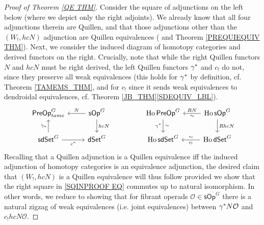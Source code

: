 \documentclass[a4paper,10pt
,draft
]{article}%
\numberwithin{equation}{section}
\numberwithin{figure}{section}
\theoremstyle{definition} %
\DeclareMathOperator{\Ho}{Ho}
\renewcommand{\O}{\ensuremath{\mathcal O}}
\newcommand{\1}{\ensuremath{\mathbbm 1}}%
\begin{document}
\begin{proof}[Proof of Theorem \ref{QE THM}]
Consider the square of adjunctions on the left below 
(where we depict only the right adjoints).
We already know that all four adjunctions therein are Quillen,
and that those adjunctions other than the
$(W_!,hcN)$
adjunction are Quillen equivalences
(\cite[Thms. 4.30 and 4.41]{BP_edss} and Theorem \ref{PREQUIEQUIV THM}).
Next, 
we consider the induced diagram of homotopy categories
and derived functors on the right.
Crucially,
note that while 
the right Quillen functors $N$ and $hcN$
must be right derived, 
the left Quillen functors $\gamma^{\**}$ and $c_!$ do not, 
since they preserve all weak equivalences
(this holds for $\gamma^{\**}$ by definition,
cf. Theorem \ref{TAMEMS_THM},
and for $c_!$ since it sends weak equivalences to dendroidal equivalences, cf. Theorem \ref{JB_THM}\ref{SDEQUIV_LBL}).
\begin{equation}\label{SQINPROOF EQ}
\begin{tikzcd}
	\mathsf{PreOp}^G_{tame} 
&
	\mathsf{sOp}^G 
	\ar{l}[swap]{N}
	\ar{d}{hcN}
&&%
	\Ho \mathsf{PreOp}^G 
	\ar{d}[swap]{\gamma^{\**}}{\sim}
&
	\Ho \mathsf{sOp}^G 
	\ar{l}[swap]{R N}{\sim}
	\ar{d}{R hcN}
\\
	\mathsf{sdSet}^G
	\ar{u}{\gamma_{\**}}
	\ar{r}[swap]{c^{\**}}
&
	\mathsf{dSet}^G
&&%
	\Ho \mathsf{sdSet}^G
&
	\Ho \mathsf{dSet}^G
	\ar{l}{c_!}[swap]{\sim}
\end{tikzcd}
\end{equation}
Recalling that a Quillen adjunction
is a Quillen equivalence iff the induced adjunction of homotopy categories is an equivalence adjunction,
the desired claim that
$(W_!,hcN)$ is a Quillen equivalence will thus follow
provided we show that the right square in 
\eqref{SQINPROOF EQ}
commutes up to natural isomorphism.
In other words, we reduce to showing that
for fibrant operads
$\O \in \mathsf{sOp}^G$
there is a natural zigzag of weak equivalences
(i.e. joint equivalences)
 between 
$\gamma^{\**} N \O$ and
$c_! hcN \O$.


\end{proof}
\end{document}
